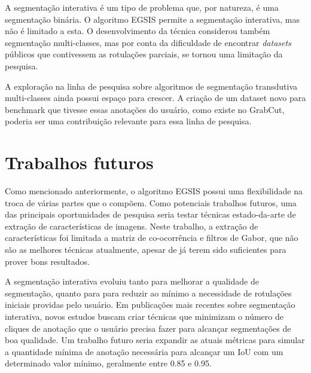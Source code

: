 A segmentação interativa é um tipo de problema que, por natureza, é
uma segmentação binária. O algoritmo \gls{EGSIS} permite a segmentação
interativa, mas não é limitado a esta. O desenvolvimento da técnica
considerou também segmentação multi-classes, mas por conta da
dificuldade de encontrar \textit{datasets} públicos que contivessem as
rotulações parciais, se tornou uma limitação da pesquisa.

A exploração na linha de pesquisa sobre algoritmos de segmentação
transdutiva multi-classes ainda possui espaço para crescer. A criação
de um dataset novo para benchmark que tivesse essas anotações do
usuário, como existe no GrabCut, poderia ser uma contribuição
relevante para essa linha de pesquisa.


\section{Trabalhos futuros}\label{sec:trabalhos-futuros}

Como mencionado anteriormente, o algoritmo \gls{EGSIS} possui uma
flexibilidade na troca de várias partes que o compõem. Como potenciais
trabalhos futuros, uma das principais oportunidades de pesquisa seria
testar técnicas estado-da-arte de extração de características de
imagens. Neste trabalho, a extração de características foi limitada a
matriz de co-ocorrência e filtros de Gabor, que não são as melhores
técnicas atualmente, apesar de já terem sido suficientes para prover
bons resultados.

A segmentação interativa evoluiu tanto para melhorar a qualidade de
segmentação, quanto para para reduzir ao mínimo a necessidade de
rotulações iniciais providas pelo usuário. Em publicações mais
recentes sobre segmentação interativa, novos estudos buscam criar
técnicas que minimizam o número de cliques de anotação que o usuário
precisa fazer para alcançar segmentações de boa qualidade. Um trabalho
futuro seria expandir as atuais métricas para simular a quantidade
mínima de anotação necessária para alcançar um IoU com um determinado
valor mínimo, geralmente entre 0.85 e 0.95.
